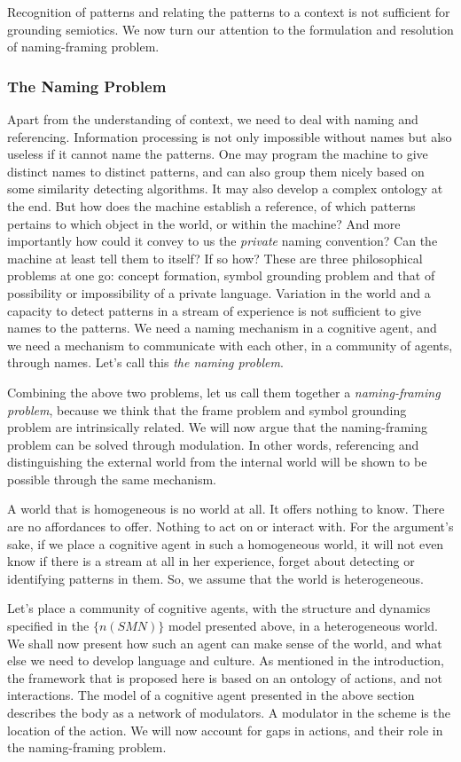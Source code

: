 Recognition of patterns and relating the patterns to a context is not sufficient for grounding semiotics. We now turn our attention to the formulation and resolution of naming-framing problem.

\subsubsection{The Naming Problem}
Apart from the understanding of context, we need to deal with naming and referencing. Information processing is not only impossible without names but also useless if it cannot name the patterns. One may program the machine to give distinct names to distinct patterns, and can also group them nicely based on some similarity detecting algorithms. It may also develop a complex ontology at the end. But how does the machine establish a reference, of which patterns pertains to which object in the world, or within the machine? And more importantly how could it convey to us the \textit{private} naming convention? Can the machine at least tell them to itself? If so how? These are three philosophical problems at one go: concept formation, symbol grounding problem and that of possibility or impossibility of a private language. Variation in the world and a capacity to detect patterns in a stream of experience is not sufficient to give names to the patterns. We need a naming mechanism in a cognitive agent, and we need a mechanism to communicate with each other, in a community of agents, through names. Let's call this \textit{the naming problem}.

Combining the above two problems, let us call them together a \textit{naming-framing problem}, because we think that the frame problem and symbol grounding problem are intrinsically related. We will now argue that the naming-framing problem can be solved through modulation. In other words, referencing and distinguishing the external world from the internal world will be shown to be possible through the same mechanism.

A world that is homogeneous is no world at all. It offers nothing to know. There are no affordances to offer. Nothing to act on or interact with. For the argument's sake, if we place a cognitive agent in such a homogeneous world, it will not even know if there is a stream at all in her experience, forget about detecting or identifying patterns in them. So, we assume that the world is heterogeneous.

Let's place a community of cognitive agents, with the structure and dynamics specified in the $\{n(SMN)\}$ model presented above, in a heterogeneous world. We shall now present how such an agent can make sense of the world, and what else we need to develop language and culture. As mentioned in the introduction, the framework that is proposed here is based on an ontology of actions, and not interactions. The model of a cognitive agent presented in the above section describes the body as a network of modulators. A modulator in the scheme is the location of the action. We will now account for gaps in actions, and their role in the naming-framing problem.

